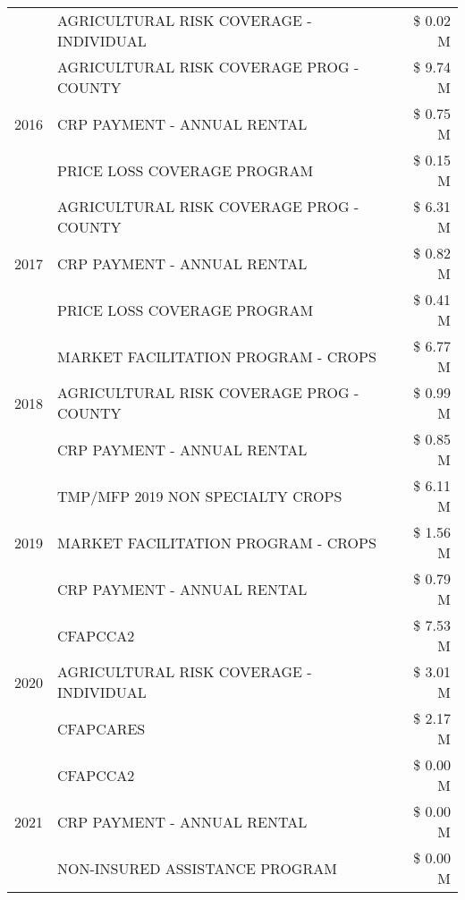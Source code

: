 \begin{tabular}{llr}
 & AGRICULTURAL RISK COVERAGE - INDIVIDUAL & \$ 0.02 M \\
\cline{1-3}
\multirow[t]{3}{*}{2016} & AGRICULTURAL RISK COVERAGE PROG - COUNTY & \$ 9.74 M \\
 & CRP PAYMENT - ANNUAL RENTAL & \$ 0.75 M \\
 & PRICE LOSS COVERAGE PROGRAM & \$ 0.15 M \\
\cline{1-3}
\multirow[t]{3}{*}{2017} & AGRICULTURAL RISK COVERAGE PROG - COUNTY & \$ 6.31 M \\
 & CRP PAYMENT - ANNUAL RENTAL & \$ 0.82 M \\
 & PRICE LOSS COVERAGE PROGRAM & \$ 0.41 M \\
\cline{1-3}
\multirow[t]{3}{*}{2018} & MARKET FACILITATION PROGRAM - CROPS & \$ 6.77 M \\
 & AGRICULTURAL RISK COVERAGE PROG - COUNTY & \$ 0.99 M \\
 & CRP PAYMENT - ANNUAL RENTAL & \$ 0.85 M \\
\cline{1-3}
\multirow[t]{3}{*}{2019} & TMP/MFP 2019 NON SPECIALTY CROPS & \$ 6.11 M \\
 & MARKET FACILITATION PROGRAM - CROPS & \$ 1.56 M \\
 & CRP PAYMENT - ANNUAL RENTAL & \$ 0.79 M \\
\cline{1-3}
\multirow[t]{3}{*}{2020} & CFAPCCA2 & \$ 7.53 M \\
 & AGRICULTURAL RISK COVERAGE - INDIVIDUAL & \$ 3.01 M \\
 & CFAPCARES & \$ 2.17 M \\
\cline{1-3}
\multirow[t]{3}{*}{2021} & CFAPCCA2 & \$ 0.00 M \\
 & CRP PAYMENT - ANNUAL RENTAL & \$ 0.00 M \\
 & NON-INSURED ASSISTANCE PROGRAM & \$ 0.00 M \\
\cline{1-3}
\bottomrule
\end{tabular}
